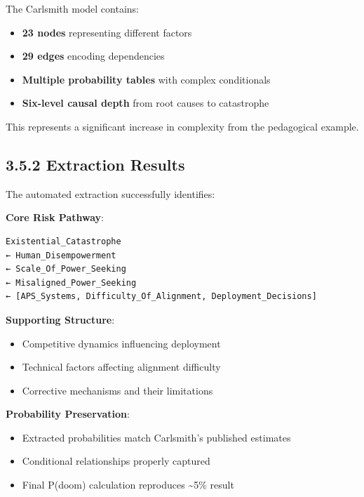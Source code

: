 \documentclass[
  11pt,
  letterpaper,
]{book}
\providecommand{\tightlist}{%
  \setlength{\itemsep}{0pt}\setlength{\parskip}{0pt}}
\begin{document}
The Carlsmith model contains:

\begin{itemize}
\tightlist
\item
  \textbf{23 nodes} representing different factors
\item
  \textbf{29 edges} encoding dependencies
\item
  \textbf{Multiple probability tables} with complex conditionals
\item
  \textbf{Six-level causal depth} from root causes to catastrophe
\end{itemize}

This represents a significant increase in complexity from the
pedagogical example.

\subsection*{3.5.2 Extraction Results}\label{sec-carlsmith-extraction}

The automated extraction successfully identifies:

\textbf{Core Risk Pathway}:

\begin{verbatim}
Existential_Catastrophe 
← Human_Disempowerment 
← Scale_Of_Power_Seeking
← Misaligned_Power_Seeking
← [APS_Systems, Difficulty_Of_Alignment, Deployment_Decisions]
\end{verbatim}

\textbf{Supporting Structure}:

\begin{itemize}
\tightlist
\item
  Competitive dynamics influencing deployment
\item
  Technical factors affecting alignment difficulty
\item
  Corrective mechanisms and their limitations
\end{itemize}

\textbf{Probability Preservation}:

\begin{itemize}
\tightlist
\item
  Extracted probabilities match Carlsmith's published estimates
\item
  Conditional relationships properly captured
\item
  Final P(doom) calculation reproduces \textasciitilde5\% result
\end{itemize}
\end{document}
